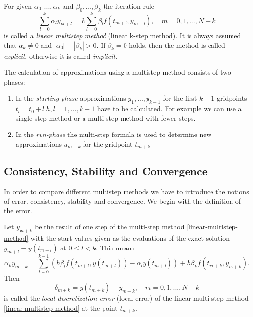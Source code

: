 	\begin{definition}
		\label{def:multi step method}
		For given $\alpha_0, ..., \alpha_k$ and $\beta_0, ..., \beta_k$ the iteration rule
		\begin{equation}
			\label{linear-multistep-method}
			\sum_{l=0}^{k} \alpha_l y_{m+l} = h \sum_{l=0}^{k} \beta_l f(t_{m+l}, y_{m+l}), \quad m=0,1,...,N-k
		\end{equation}
		is called a \emph{linear multistep method} (linear k-step method). It is always assumed that $\alpha_k \neq 0$ and $|\alpha_0| + |\beta_k| > 0$. If $\beta_k=0$ holds, then the method is called \emph{explicit}, otherwise it is called \emph{implicit}.
	\end{definition}
	
	The calculation of approximations using a multistep method consists of two phases:
	\begin{enumerate}
		\item In the \emph{starting-phase} approximations $y_1,...,y_{k-1}$ for the first $k-1$ gridpoints $t_l = t_0+l\ h, l=1,...,k-1$ have to be calculated. For example we can use a single-step method or a multi-step method with fewer steps.
		
		\item  In the \emph{run-phase} the multi-step formula is used to determine new approximations $u_{m+k}$ for the gridpoint $t_{m+k}$
	\end{enumerate}
	

	
	\subsection{Consistency, Stability and Convergence}
	\cite{NumerikGewöhnlicherDifferentialgleichungen}
	
	In order to compare different multistep methods we have to introduce the notions of error, consistency, stability and convergence. We begin with the definition of the error.
	\begin{definition}
		Let $y_{m+k}$ be the result of one step of the multi-step method \eqref{linear-multistep-method} with the start-values given as the evaluations of the exact solution $y_{m+l} = y(t_{m+l})$ at $0 \leq l < k$. This means
		\begin{displaymath}
			\alpha_k y_{m+k} = \sum_{l=0}^{k-1} \left( h \beta_l f(t_{m+l}, y(t_{m+l})) - \alpha_l y(t_{m+l}) \right) + h \beta_k f(t_{m+k}, y_{m+k}) .
		\end{displaymath}
		Then
		\begin{displaymath}
			\delta_{m+k} = y(t_{m+k}) - y_{m+k}, \quad m=0,1,...,N-k
		\end{displaymath}
		is called the \emph{local discretization error} (local error) of the linear multi-step method \eqref{linear-multistep-method} at the point $t_{m+k}$.
	\end{definition}
	

